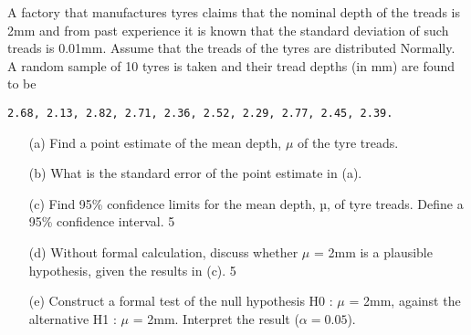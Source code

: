 \documentclass[a4paper,12pt]{article}
\begin{document}

A factory that manufactures tyres claims that the nominal depth of the treads is 2mm and from past experience it is known that the standard deviation of such treads is 0.01mm. Assume that the treads of the tyres are distributed Normally. A random sample of 10 tyres is taken and their tread depths (in mm) are found to be 

\begin{verbatim} 
2.68, 2.13, 2.82, 2.71, 2.36, 2.52, 2.29, 2.77, 2.45, 2.39.
\end{verbatim} 
\begin{itemize} 
\item[(a)] Find a point estimate of the mean depth, $\mu$ of the tyre treads. 	
 
\item[(b)] What is the standard error of the point estimate in (a). 			
 
\item[(c)] Find 95\% confidence limits for the mean depth, µ, of tyre treads. Define a 95\%  confidence interval. 						5
 
\item[(d)] Without formal calculation, discuss whether $\mu$ = 2mm is a plausible  hypothesis,   given the results in (c). 						5
 
\item[(e)] Construct a formal test of the null hypothesis 
H0 : $\mu$ = 2mm, against the alternative  H1 : $\mu$ = 2mm. Interpret the result ($\alpha = 0.05$).		 										
 
 \end{itemize}
 
\end{document}

